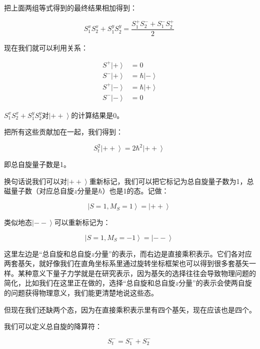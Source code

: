 把上面两组等式得到的最终结果相加得到：

\begin{equation}
S_1^x S_2^x + S_1^y S_2^y = \frac{ S_1^+ S_2^- + S_1^- S_2^+  }{2}~
\end{equation}

现在我们就可以利用关系：

\begin{align}
S^+ \left| + \right\rangle & = 0 \\
S^- \left| + \right\rangle &=\hbar \left| - \right\rangle \\
S^+ \left| - \right\rangle & =  \hbar \left| + \right\rangle \\
S^- \left| - \right\rangle & = 0~
\end{align}

$S_1^x S_2^x + S_1^y S_2^y$对$\left| ++ \right\rangle $的计算结果是0。

把所有这些贡献加在一起，我们得到：

\begin{equation}
S_t^2 \left| ++ \right\rangle = 2 \hbar^2 \left| ++ \right\rangle~
\end{equation}

即总自旋量子数是1。

换句话说我们可以对$\left| ++ \right\rangle $重新标记，我们可以把它标记为总自旋量子数为1，总磁量子数（对应总自旋$z$分量是$\hbar$）也是1的态。记做：

\begin{equation}
\left| S=1, M_S =1 \right\rangle = \left| ++ \right\rangle~
\end{equation}

类似地态$\left| -- \right\rangle $可以重新标记为：

\begin{equation}
\left| S=1, M_S =-1 \right\rangle = \left| -- \right\rangle~
\end{equation}

这里左边是“总自旋和总自旋$z$分量”的表示，而右边是直接乘积表示。它们各对应两套基矢，就好像我们在直角坐标系里通过旋转坐标框架也可以得到很多套基矢一样。某种意义下量子力学就是在研究表示，因为基矢的选择往往会导致物理问题的简化，比如我们在这里正在做的，选择“总自旋和总自旋$z$分量”的表示会使两自旋的问题获得物理意义，我们能更清楚地说这些态。

但现在我们还缺两个态，因为在直接乘积表示里有四个基矢，现在应该也是四个。

我们可以定义总自旋的降算符：

\begin{equation}
S_t^- = S_1^- + S_2^-~
\end{equation}

